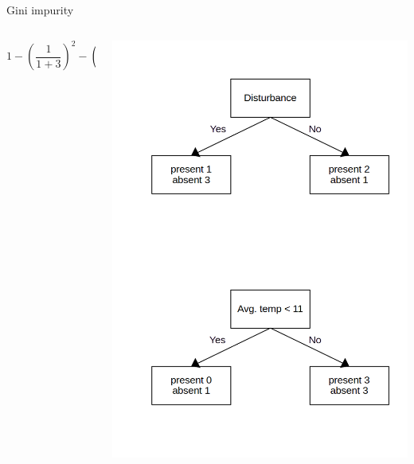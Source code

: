 \documentclass{irdbeamer}
\begin{document}
\begin{frame}{Gini impurity}
\begin{columns}
    \begin{column}{0.5\textwidth}
\centering
$$
        1 - (\frac{1}{1+3})^2 - (\frac{3}{1+3})^2 = 0.375
 $$
    \end{column}
    \begin{column}{0.5\textwidth}
\centering
    \includegraphics[width=.8\textwidth]{./figs/schemas/gini.png}%
\end{column}
\end{columns}
\end{frame}
\end{document}
